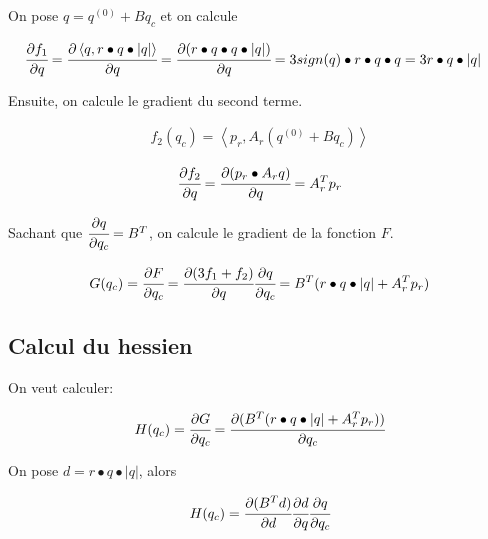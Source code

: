 On pose $q = q^{(0)} + B q_c$ et on calcule

\vspace{-1.5em}
\begin{align}
  \cfrac{\partial f_1}{\partial q} &= \cfrac{\partial  \left \langle q, r \bullet q \bullet |q| \right \rangle}{\partial q} = \cfrac{\partial(r \bullet q \bullet q \bullet |q|)}{\partial q} = 3sign(q) \bullet r \bullet q \bullet q = 3r \bullet q \bullet |q|
\end{align}

Ensuite, on calcule le gradient du second terme.

\vspace{-1.5em}
\begin{align}
  f_2 (q_c) = \left \langle p_r, A_r (q^{(0)} + B q_c) \right \rangle
\end{align}

\vspace{-1.5em}
\begin{align}
  \cfrac{\partial f_2}{\partial q} = \cfrac{\partial (p_r \bullet A_r q)}{\partial q} = A_r^T p_r
\end{align}

Sachant que $\cfrac{\partial q}{\partial q_c} = B^T$, on calcule le gradient de la fonction $F$.

\vspace{-1.5em}
\begin{align}
  G(q_c) = \cfrac{\partial F}{\partial q_c} = \cfrac{\partial (3f_1 + f_2)}{\partial q} \cfrac{\partial q}{\partial q_c} = B^T (r \bullet q \bullet |q| + A_r^T p_r)
\end{align}

\subsection{Calcul du hessien}

On veut calculer:

\vspace{-1.5em}
\begin{align}
  H(q_c) = \cfrac{\partial G}{\partial q_c} = \cfrac{\partial (B^T(r \bullet q \bullet |q| + A_r^T p_r))}{\partial q_c}
\end{align}

On pose $d = r \bullet q \bullet |q|$, alors

\vspace{-1.5em}
\begin{align}
 H(q_c) = \cfrac{\partial (B^T d)}{\partial d} \cfrac{\partial d}{\partial q} \cfrac{\partial q}{\partial q_c} 
\end{align}

